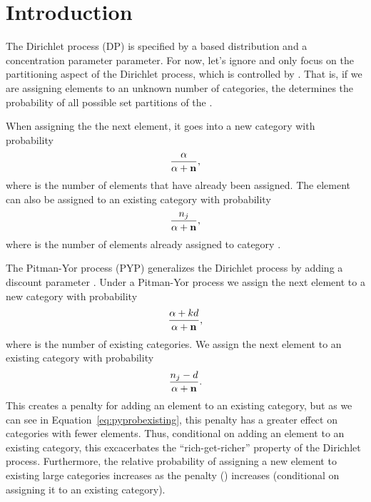 \section{Introduction}

The Dirichlet process (DP) is specified by a based distribution \basedistribution
and a concentration parameter \concentration parameter.
For now, let's ignore \basedistribution and only focus on the partitioning
aspect of the Dirichlet process, which is controlled by \concentration.
That is, if we are assigning \numelements elements to an unknown number of
categories, the \concentration determines the probability of all possible set
partitions of the \numelements.

When assigning the the next element, it goes into
a new category with probability
\begin{equation}
    \frac{\concentration}{\concentration + \numassignedtotal},
    \label{eq:dpprobnew}
\end{equation}
where \numassignedtotal is the number of elements that have already been
assigned.
The element can also be assigned to an existing category \catindex with probability
\begin{equation}
    \frac{\numassigned[\catindex]}{\concentration + \numassignedtotal},
    \label{eq:dpprobexisting}
\end{equation}
where \numassigned[\catindex] is the number of elements already assigned
to category \catindex.

The Pitman-Yor process (PYP) generalizes the Dirichlet process by adding
a discount parameter \discount.
Under a Pitman-Yor process
we assign the next element to a new category with probability
\begin{equation}
    \frac{\concentration + \numcats\discount}{\concentration + \numassignedtotal},
    \label{eq:pyprobnew}
\end{equation}
where \numcats is the number of existing categories.
We assign the next element to an existing category with probability
\begin{equation}
    \frac{\numassigned[\catindex] - \discount}{\concentration + \numassignedtotal}.
    \label{eq:pyprobexisting}
\end{equation}
This creates a penalty for adding an element to an existing category, but as we
can see in Equation~\ref{eq:pyprobexisting}, this penalty has a greater effect
on categories with fewer elements.
Thus, conditional on adding an element to an existing category, this
excacerbates the ``rich-get-richer'' property of the Dirichlet process.
Furthermore, the relative probability of assigning a new element to existing
large categories increases as the penalty (\discount) increases (conditional on
assigning it to an existing category).

